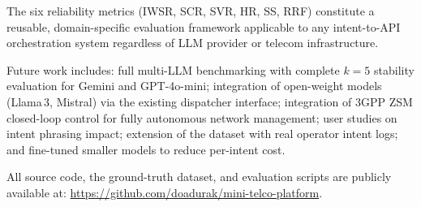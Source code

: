 \documentclass[conference]{IEEEtran}
\begin{document}
The six reliability metrics (IWSR, SCR, SVR, HR, SS, RRF) constitute
a reusable, domain-specific evaluation framework applicable to any
intent-to-API orchestration system regardless of LLM provider or
telecom infrastructure.

Future work includes: full multi-LLM benchmarking with complete
$k=5$ stability evaluation for Gemini and GPT-4o-mini;
integration of open-weight models (Llama\,3, Mistral) via the existing
dispatcher interface;
integration of 3GPP ZSM closed-loop control for fully autonomous network
management; user studies on intent phrasing impact; extension of the
dataset with real operator intent logs; and fine-tuned smaller models
to reduce per-intent cost.

All source code, the ground-truth dataset, and evaluation scripts are
publicly available at:
\url{https://github.com/doadurak/mini-telco-platform}.
\end{document}
